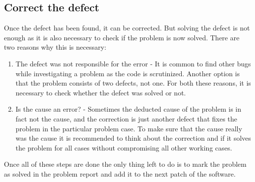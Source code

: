 \subsection{Correct the defect}
\label{aodZellerCorrectDefect}
Once the defect has been found, it can be corrected. But solving the defect is not enough as it is also necessary to check if the problem is now solved. There are two reasons why this is necessary:
\begin{enumerate}
  \item The defect was not responsible for the error - It is common to find other bugs while investigating a problem as the code is scrutinized. Another option is that the problem consists of two defects, not one. For both these reasons, it is necessary to check whether the defect was solved or not.
  \item Is the cause an error? - Sometimes the deducted cause of the problem is in fact not the cause, and the correction is just another defect that fixes the problem in the particular problem case. To make sure that the cause really was the cause it is recommended to think about the correction and if it solves the problem for all cases without compromising all other working cases.
\end{enumerate}

Once all of these steps are done the only thing left to do is to mark the problem as solved in the problem report and add it to the next patch of the software.
